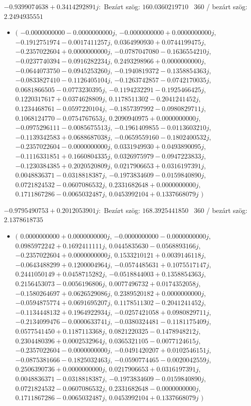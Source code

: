 \documentclass[14pt,a4paper]{article}
\begin{document}
$-0.9399074638+0.3414292891j$:\
Bezárt szög: $160.0360219710$ \
360 / bezárt szög: $2.2494935551$\
\begin{itemize}
\item
$\big($
$-0.0000000000-0.0000000000j$, $-0.0000000000+0.0000000000j$, $-0.1912751974-0.0017411257j$, $0.0364990930+0.0744199475j$, $-0.2357022604+0.0000000000j$, $-0.0787047080-0.1636554210j$, $-0.0237740394-0.0916282234j$, $0.2493298966+0.0000000000j$, $-0.0644073750-0.0945253260j$, $-0.1940819372-0.1358854363j$, $-0.0833827410-0.1126405104j$, $-0.1263742857-0.0742170035j$, $0.0681866505-0.0773230395j$, $-0.1194232291-0.1925466425j$, $0.1220317617+0.0374628809j$, $0.1178511302-0.2041241452j$, $0.1234468761-0.0597220104j$, $-0.1857397992-0.0980829711j$, $0.1068124770-0.0754767653j$, $0.2090940975+0.0000000000j$, $-0.0975296111-0.0085675513j$, $-0.1961409855-0.0113603210j$, $-0.1139342583+0.0688687038j$, $-0.0659559160-0.1802400532j$, $-0.2357022604-0.0000000000j$, $0.0331949930+0.0493890095j$, $-0.1116331851+0.1660804335j$, $0.0326975979-0.0947223833j$, $-0.1230384385+0.2020520809j$, $0.0217906653+0.0316197391j$, $0.0048836371-0.0318818387j$, $-0.1973834609-0.0159840890j$, $0.0721824532-0.0607086532j$, $0.2331682648+0.0000000000j$, $0.1711867286-0.0065032487j$, $0.0453992104+0.1337668079j$
$\big)$
\end{itemize}
$-0.9795490753+0.2012053901j$:\
Bezárt szög: $168.3925441850$ \
360 / bezárt szög: $2.1378618735$\
\begin{itemize}
\item
$\big($
$0.0000000000+0.0000000000j$, $-0.0000000000-0.0000000000j$, $0.0985972242+0.1692411111j$, $0.0445835630-0.0568893166j$, $-0.2357022604+0.0000000000j$, $0.1533210121+0.0039146118j$, $-0.0643488299+0.1200004964j$, $-0.0574485631+0.1075517147j$, $0.2441050149+0.0458715282j$, $-0.0518844003+0.1358854363j$, $0.2156453073-0.0056196806j$, $0.0077496732+0.0174352058j$, $-0.1580264697+0.0626529086j$, $0.2389520182+0.0000000000j$, $-0.0594875774+0.0691695207j$, $0.1178511302-0.2041241452j$, $-0.1134448132+0.1964922934j$, $-0.0257421058+0.0980829711j$, $-0.2134099476-0.0000633741j$, $-0.0380324481-0.1181175409j$, $0.0577541450+0.1187113368j$, $0.0821220325-0.1478948212j$, $0.2304480396+0.0002532964j$, $0.0365321105-0.0077124615j$, $-0.2357022604-0.0000000000j$, $-0.0491420207+0.0102546151j$, $-0.0875381666-0.1825032463j$, $-0.0590774465-0.0020042559j$, $0.2506390736+0.0000000000j$, $0.0217906653+0.0316197391j$, $0.0048836371-0.0318818387j$, $-0.1973834609-0.0159840890j$, $0.0721824532-0.0607086532j$, $0.2331682648-0.0000000000j$, $0.1711867286-0.0065032487j$, $0.0453992104+0.1337668079j$
$\big)$
\end{itemize}
\end{document}
